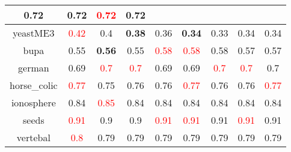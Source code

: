 \documentclass{article}%
\begin{document}
\begin{tabular}{c|cccccccc}
{0.72
}&0.72&\textcolor{red}{ 
0.72
}&0.72\\%
\hline%
yeastME3&\textcolor{red}{ 
0.42
}&0.4&\textbf{0.38}&0.36&\textbf{0.34}&0.33&0.34&0.34\\%
\hline%
bupa&0.55&\textbf{0.56}&0.55&\textcolor{red}{ 
0.58
}&\textcolor{red}{ 
0.58
}&0.58&0.57&0.57\\%
\hline%
german&0.69&\textcolor{red}{ 
0.7
}&\textcolor{red}{ 
0.7
}&0.69&0.69&\textcolor{red}{ 
0.7
}&\textcolor{red}{ 
0.7
}&0.7\\%
\hline%
horse\_colic&\textcolor{red}{ 
0.77
}&0.75&0.76&0.76&\textcolor{red}{ 
0.77
}&0.76&0.76&\textcolor{red}{ 
0.77
}\\%
\hline%
ionosphere&0.84&\textcolor{red}{ 
0.85
}&0.84&0.84&0.84&0.84&0.84&0.84\\%
\hline%
seeds&\textcolor{red}{ 
0.91
}&0.9&0.9&\textcolor{red}{ 
0.91
}&\textcolor{red}{ 
0.91
}&0.91&\textcolor{red}{ 
0.91
}&0.91\\%
\hline%
vertebal&\textcolor{red}{ 
0.8
}&0.79&0.79&0.79&0.79&0.79&0.79&0.79\\%
\hline%
\end{tabular}

%
\end{document}
